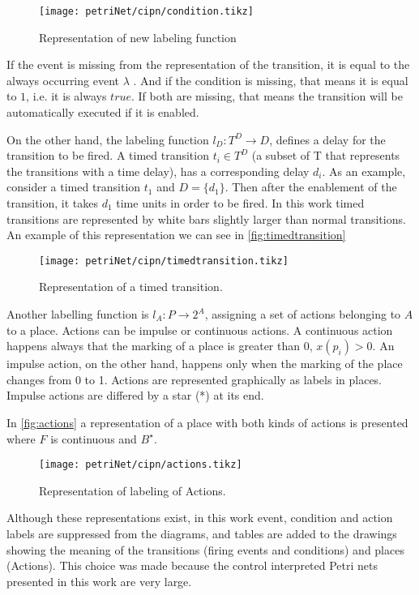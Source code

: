 \begin{figure}[H]
  \centering \texttt{[image: petriNet/cipn/condition.tikz]}
  \caption{Representation of new labeling function}
  \label{fig:condition}
\end{figure}

If the event is missing from the representation of the transition, it is equal
to the always occurring event $\lambda$
. And if the condition is missing, that means it is
equal to $1$, i.e. it is always $true$. If both are missing, that means the
transition will be automatically executed if it is enabled. 

On the other hand, the labeling function $l_D : T^D \rightarrow D$, defines a delay for the
transition to be fired. A timed transition $t_i \in T^D$ (a subset of T
that represents the transitions with a time delay), has a corresponding delay
$d_i$. As an example, consider a timed transition $t_1$ and $D=\{d_1\}$. Then after the
enablement of the transition, it takes $d_1$ time units in order to be fired. In
this work timed transitions are represented by white bars slightly larger than normal
transitions. An example of this representation we can see in \autoref{fig:timedtransition}

\begin{figure}[H]
  \centering \texttt{[image: petriNet/cipn/timedtransition.tikz]}
  \caption{Representation of a timed transition.}
  \label{fig:timedtransition}
\end{figure}
Another labelling function is $l_A : P\rightarrow 2^A$,
assigning a set of actions belonging to $A$ to a place. Actions can be impulse
or continuous actions. A
continuous action happens always that the marking of a place is greater than 0,
$x(p_i)>0$. An impulse action, on the other hand, happens only when the marking of
the place changes from 0 to 1. 
Actions are represented graphically as labels in places. Impulse actions are
differed by a star (*) at its end.

In \autoref{fig:actions} a representation of a place with both kinds of actions
is presented where $F$ is continuous and $B^\star$.
\begin{figure}[H]
  \centering \texttt{[image: petriNet/cipn/actions.tikz]}
  \caption{Representation of labeling of Actions.}
  \label{fig:actions}
\end{figure}

Although these representations exist, in this work event, condition and
action labels are suppressed from the diagrams, and tables are added to the drawings
showing the meaning of the transitions (firing events and conditions) and places
(Actions). This choice was made because the control interpreted Petri nets
presented in this work are very
large.

